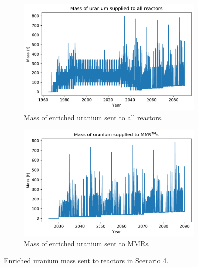 \begin{figure}
    \centering
    \begin{subfigure}{0.45\textwidth}
        \centering
        \includegraphics[scale=0.4]{../figures/fuelsupply_scenarios_4.pdf}
        \caption{Mass of enriched uranium sent to all reactors.}
        \label{fig:totalfuel_4}
    \end{subfigure}
    \hspace{0.8cm}
    \begin{subfigure}{0.45\textwidth}
        \centering
        \includegraphics[scale=0.4]{../figures/advancedRX_fuelsupply_scenarios_4.pdf}
        \caption{Mass of enriched uranium sent to \glspl{MMR}.}
        \label{fig:haleu_4}
    \end{subfigure}
    \caption{Enriched uranium mass sent to reactors in Scenario 4.}
    \label{fig:fuel_4}
\end{figure}

